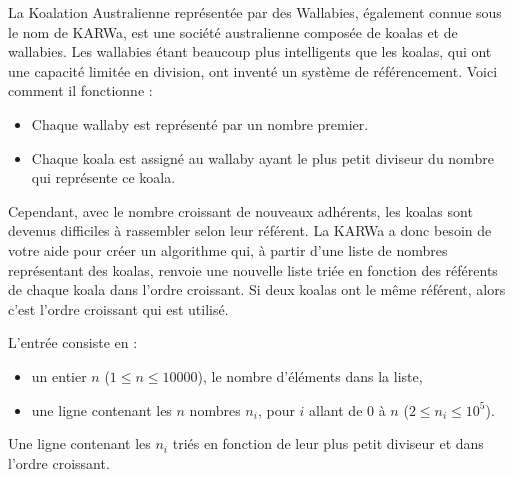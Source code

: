 \problemname{\problemyamlname}

La Koalation Australienne représentée par des Wallabies, également connue sous le nom de KARWa, est une société australienne composée de koalas et de wallabies. Les wallabies étant beaucoup plus intelligents que les koalas, qui ont une capacité limitée en division, ont inventé un système de référencement. Voici comment il fonctionne :

\begin{itemize}
	\item Chaque wallaby est représenté par un nombre premier.
	\item Chaque koala est assigné au wallaby ayant le plus petit diviseur du nombre qui représente ce koala.
\end{itemize}
Cependant, avec le nombre croissant de nouveaux adhérents, les koalas sont devenus difficiles à rassembler selon leur référent. La KARWa a donc besoin de votre aide pour créer un algorithme qui, à partir d'une liste de nombres représentant des koalas, renvoie une nouvelle liste triée en fonction des référents de chaque koala dans l'ordre croissant. Si deux koalas ont le même référent, alors c'est l'ordre croissant qui est utilisé.

\begin{Input}
	L'entrée consiste en :
	\begin{itemize}
		\item un entier $n$ ($1 \leq n \leq 10 000$), le nombre d'éléments dans la liste,
		\item une ligne contenant les $n$ nombres $n_i$, pour $i$ allant de $0$ à $n$ ($2 \leq n_i \leq 10^5$).
	\end{itemize}
\end{Input}

\begin{Output}
	Une ligne contenant les $n_i$ triés en fonction de leur plus petit diviseur et dans l'ordre croissant.
\end{Output}
